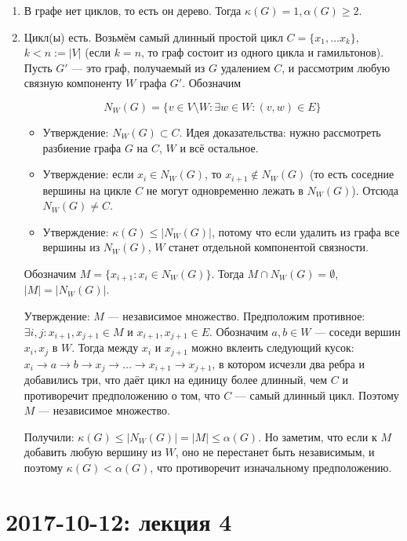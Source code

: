 \documentclass[12pt]{article}
\begin{document}
\begin{enumerate}
\item В графе нет циклов, то есть он дерево. Тогда $\kappa(G) = 1, \alpha(G) \geq 2$.
\item Цикл(ы) есть. Возьмём самый длинный простой цикл $C = \{ x_1, \ldots x_k \}$, $k < n := |V|$ (если $k = n$, то граф состоит из одного цикла и гамильтонов). Пусть $G'$ — это граф, получаемый из $G$ удалением $C$, и рассмотрим любую связную компоненту $W$ графа $G'$. Обозначим

\[ N_W(G) = \{ v \in V \setminus W \colon \exists w \in W \colon (v, w) \in E \} \]

\begin{itemize}
\item Утверждение: $N_W(G) \subset C$. Идея доказательства: нужно рассмотреть разбиение графа $G$ на $C$, $W$ и всё остальное.
\item Утверждение: если $x_i \in N_W(G)$, то $x_{i+1} \not\in N_W(G)$ (то есть соседние вершины на цикле $C$ не могут одновременно лежать в $N_W(G)$). Отсюда $N_W(G) \neq C$.
\item Утверждение: $\kappa(G) \leq |N_W(G)|$, потому что если удалить из графа все вершины из $N_W(G)$, $W$ станет отдельной компонентой связности.
\end{itemize}

Обозначим $M = \{ x_{i+1} \colon x_i \in N_W(G) \}$. Тогда $M \cap N_W(G) = \emptyset$, $|M| = |N_W(G)|$.

Утверждение: $M$ — независимое множество. Предположим противное: $\exists i, j \colon x_{i + 1}, x_{j + 1} \in M$ и $x_{i + 1}, x_{j + 1} \in E$. Обозначим $a, b \in W$ — соседи вершин $x_i, x_j$ в $W$. Тогда между $x_i$ и $x_{j + 1}$ можно вклеить следующий кусок: $x_i \to a \to b \to x_j \to \ldots \to x_{i + 1} \to x_{j + 1}$, в котором исчезли два ребра и добавились три, что даёт цикл на единицу более длинный, чем $C$ и противоречит предположению о том, что $C$ — самый длинный цикл. Поэтому $M$ — независимое множество.

Получили: $\kappa(G) \leq |N_W(G)| = |M| \leq \alpha(G)$. Но заметим, что если к $M$ добавить любую вершину из $W$, оно не перестанет быть независимым, и поэтому $\kappa(G) < \alpha(G)$, что противоречит изначальному предположению.
\end{enumerate}

\section{2017-10-12: лекция 4}
\end{document}
